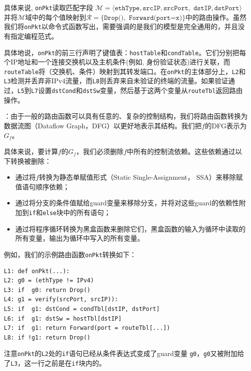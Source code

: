 具体来说, \texttt{onPkt}读取匹配字段
$\mathcal{M} = \langle \texttt{ethType}, \texttt{srcIP}, \texttt{srcPort},$ $ \texttt{dstIP}, \texttt{dstPort} \rangle$ 
并将$\mathcal{M}$域中的每个值映射到$\mathcal{R}=\{\texttt{Drop()}, $ $\texttt{Forward(port=x)} \}$中的路由操作。虽然我们将\texttt{onPkt}以命令式函数写出，需要强调的是我们的模型是完全通用的，并且没有指定编程范式。


具体地说，\texttt{onPkt}的前三行声明了键值表：\texttt{hostTable}和\texttt{condTable}。它们分别把每个IP地址和一个连接交换机以及主机条件(例如, 身份验证状态)进行关联，而\texttt{routeTable}将（交换机、条件）映射到其转发端口。在\texttt{onPkt}的主体部分上，\texttt{L2}和\texttt{L3}检测并丢弃非IPv4流量，而\texttt{L8}则丢弃来自未验证的终端的流量。如果验证通过，\texttt{L5}到\texttt{L7}设置\texttt{dstCond}和\texttt{dstSw}变量，然后基于这两个变量从\texttt{routeTbl}返回路由操作。



：由于一般的路由函数可以具有任意的、复杂的控制结构，我们将路由函数转换为数据流图（Dataflow Graph，DFG）以更好地表示其结构。我们把$f$的DFG表示为$G_f$。

具体来说，要计算$f$的$G_f$，我们必须删除$f$中所有的控制流依赖。这些依赖通过以下转换被删除：

\begin{itemize}
  \item 通过将$f$转换为静态单赋值形式（Static Single-Assignment， SSA）来移除赋值语句顺序依赖；
  \item 通过将分支的条件值赋给guard变量来移除分支，并将对这些guard的依赖性附加到\texttt{if}和\texttt{else}块中的所有语句；
  \item 通过将程序循环转换为黑盒函数来删除它们，黑盒函数的输入为循环中读取的所有变量，输出为循环中写入的所有变量。
\end{itemize}

例如，我们的示例路由函数\texttt{onPkt}转换如下：

{\small
\begin{verbatim}
L1: def onPkt(...):
L2: g0 = (ethType != IPv4)
L3: if  g0: return Drop()
L4: g1 = verify(srcPort, srcIP)):
L5: if  g1: dstCond = condTbl[dstIP, dstPort]
L6: if  g1: dstSw = hostTbl[dstIP]
L7: if  g1: return Forward(port = routeTbl[...])
L8: if !g1: return Drop()
\end{verbatim}
}

注意\texttt{onPkt}的\texttt{L2}处的\texttt{if}语句已经从条件表达式变成了guard变量 \texttt{g0}，\texttt{g0}又被附加给了\texttt{L3}，这一行之前是在\texttt{if}块内的。

